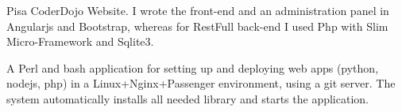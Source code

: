 \documentclass[a4paper]{deedy-resume} %
\begin{document}
\begin{minipage}[t]{0.66\textwidth}
Pisa CoderDojo  Website. I wrote the front-end and an administration panel in Angularjs and Bootstrap, whereas for RestFull back-end I used Php with Slim Micro-Framework and Sqlite3.
\sectionspace %



A Perl and bash application for setting up and deploying web apps (python, nodejs, php) in a Linux+Nginx+Passenger environment, using a git server. The system automatically installs all needed library and starts the application.

\sectionspace %



\end{minipage} %








\end{document}
